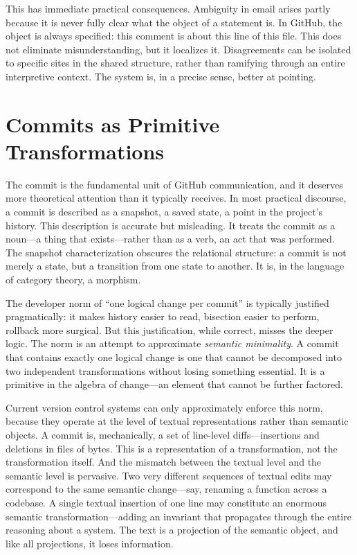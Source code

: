 \documentclass[12pt, letterpaper]{article}
\begin{document}
This has immediate practical consequences. Ambiguity in email arises partly because it is never fully clear what the object of a statement is. In GitHub, the object is always specified: this comment is about this line of this file. This does not eliminate misunderstanding, but it localizes it. Disagreements can be isolated to specific sites in the shared structure, rather than ramifying through an entire interpretive context. The system is, in a precise sense, better at pointing.

\section{Commits as Primitive Transformations}

The commit is the fundamental unit of GitHub communication, and it deserves more theoretical attention than it typically receives. In most practical discourse, a commit is described as a snapshot, a saved state, a point in the project's history. This description is accurate but misleading. It treats the commit as a noun---a thing that exists---rather than as a verb, an act that was performed. The snapshot characterization obscures the relational structure: a commit is not merely a state, but a transition from one state to another. It is, in the language of category theory, a morphism.

The developer norm of ``one logical change per commit'' is typically justified pragmatically: it makes history easier to read, bisection easier to perform, rollback more surgical. But this justification, while correct, misses the deeper logic. The norm is an attempt to approximate \emph{semantic minimality}. A commit that contains exactly one logical change is one that cannot be decomposed into two independent transformations without losing something essential. It is a primitive in the algebra of change---an element that cannot be further factored.

Current version control systems can only approximately enforce this norm, because they operate at the level of textual representations rather than semantic objects. A commit is, mechanically, a set of line-level diffs---insertions and deletions in files of bytes. This is a representation of a transformation, not the transformation itself. And the mismatch between the textual level and the semantic level is pervasive. Two very different sequences of textual edits may correspond to the same semantic change---say, renaming a function across a codebase. A single textual insertion of one line may constitute an enormous semantic transformation---adding an invariant that propagates through the entire reasoning about a system. The text is a projection of the semantic object, and like all projections, it loses information.
\end{document}
